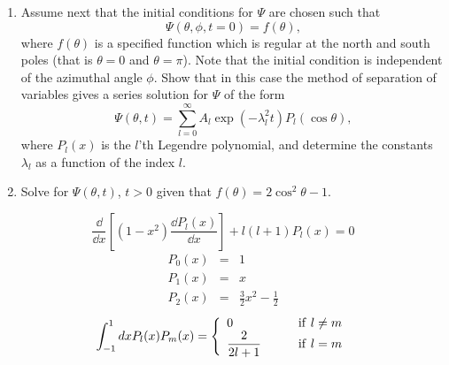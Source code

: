 {\begin{Exercise}
\begin{enumerate}
    equation satisfied by $\Theta$. What are appropriate
    boundary conditions for $\Theta$? The resulting equation is known as 
    the generalized or associated Legendre equation.
  \item Assume next that the initial conditions for $\Psi$ are
    chosen such that
    \begin{displaymath}
      \Psi(\theta,\phi,t=0) = f(\theta),
    \end{displaymath}
    where $f(\theta)$ is a specified function which is regular at
    the north and south poles (that is $\theta = 0$ and $ \theta = \pi$).
    Note that the initial condition is independent
    of the azimuthal angle $\phi$. Show that in this case the method of
    separation of variables gives a series solution for $\Psi$ of the 
    form
    \begin{displaymath}
      \Psi(\theta,t) = \sum_{l=0}^{\infty} A_l \exp(-\lambda_l^2 t) P_l(\cos\theta),
    \end{displaymath}
    where $P_l(x)$ is the $l$'th Legendre polynomial, and determine
    the constants $\lambda_l$ as a function of the index $l$.
  \item Solve for $\Psi(\theta,t)$, $ t > 0$ given that
    $f(\theta) = 2\cos^2\theta- 1$.
  \end{enumerate}
  \begin{displaymath}
    \frac{\dd}{\dd x} \left[(1-x^2) \frac{\dd P_l(x)}{\dd x}\right] + l(l+1)P_l(x) = 0
  \end{displaymath}
  \begin{eqnarray*}
    P_0(x) &=& 1 \\
    P_1(x) &=& x \\
    P_2(x) &=& \frac{3}{2}x^2 - \frac{1}{2}
  \end{eqnarray*}
  \begin{displaymath}
    \int_{-1}^1 dx P_l(x) P_m(x) = 
    \left\{
      \begin{array}{ll}
        0 \qquad &{\rm if~} l\neq m \\
        \displaystyle \frac{2}{2l+1}\qquad &{\rm if~} l = m \\
      \end{array}
    \right.
  \end{displaymath}

\end{Exercise}





}
